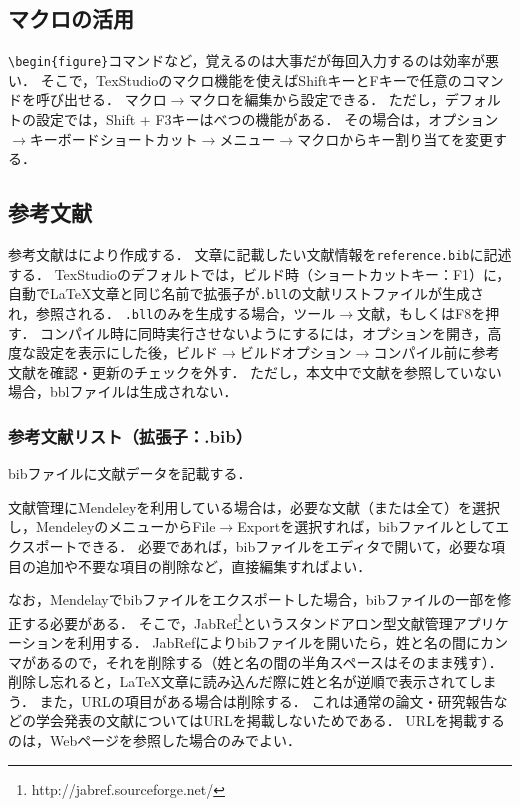 \documentclass[uplatex]{jsarticle}
\begin{document}
\subsection{マクロの活用}

\verb|\begin{figure}|コマンドなど，覚えるのは大事だが毎回入力するのは効率が悪い．
そこで，TexStudioのマクロ機能を使えばShiftキーとFキーで任意のコマンドを呼び出せる．
マクロ$\to$マクロを編集から設定できる．
ただし，デフォルトの設定では，Shift + F3キーはべつの機能がある．
その場合は，オプション$\to$キーボードショートカット$\to$メニュー$\to$マクロからキー割り当てを変更する．


\subsection{参考文献}
参考文献は\BibTeX により作成する．
文章に記載したい文献情報を\texttt{reference.bib}に記述する．
TexStudioのデフォルトでは，ビルド時（ショートカットキー：F1）に，自動で\LaTeX 文章と同じ名前で拡張子が\texttt{.bll}の文献リストファイルが生成され，参照される．
\texttt{.bll}のみを生成する場合，ツール$\to$文献，もしくはF8を押す．
コンパイル時に同時実行させないようにするには，オプションを開き，高度な設定を表示にした後，ビルド$\to$ビルドオプション$\to$コンパイル前に参考文献を確認・更新のチェックを外す．
ただし，本文中で文献を参照していない場合，bblファイルは生成されない．

\subsubsection{参考文献リスト（拡張子：.bib）}
bibファイルに文献データを記載する．

文献管理にMendeleyを利用している場合は，必要な文献（または全て）を選択し，MendeleyのメニューからFile$\rightarrow$Exportを選択すれば，bibファイルとしてエクスポートできる．
必要であれば，bibファイルをエディタで開いて，必要な項目の追加や不要な項目の削除など，直接編集すればよい．

なお，Mendelayでbibファイルをエクスポートした場合，bibファイルの一部を修正する必要がある．
そこで，JabRef\footnote{http://jabref.sourceforge.net/}というスタンドアロン型文献管理アプリケーションを利用する．
JabRefによりbibファイルを開いたら，姓と名の間にカンマがあるので，それを削除する（姓と名の間の半角スペースはそのまま残す）．
削除し忘れると，\LaTeX 文章に読み込んだ際に姓と名が逆順で表示されてしまう．
また，URLの項目がある場合は削除する．
これは通常の論文・研究報告などの学会発表の文献についてはURLを掲載しないためである．
URLを掲載するのは，Webページを参照した場合のみでよい．
\end{document}
